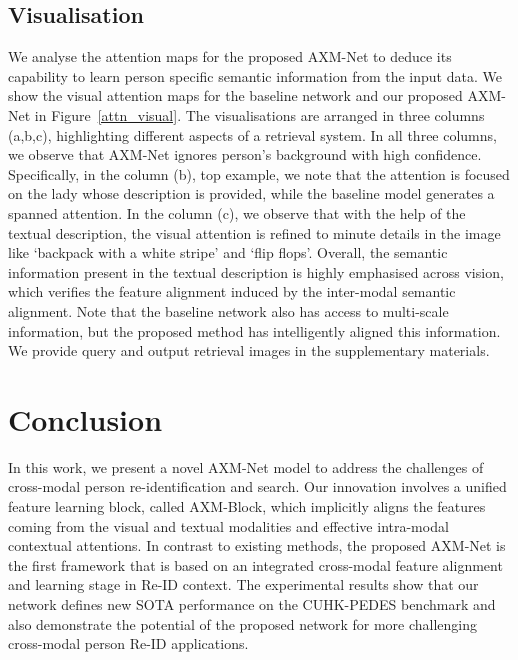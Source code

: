 \documentclass[10pt,twocolumn,letterpaper]{article}
\begin{document}
\subsection{Visualisation} \label{sec:Visualisation}
We analyse the attention maps for the proposed AXM-Net to deduce its capability to learn person specific semantic information from the input data. We show the visual attention maps for the baseline network and our proposed AXM-Net in Figure~\ref{attn_visual}. The visualisations are arranged in three columns (a,b,c), highlighting different aspects of a retrieval system. In all three columns, we observe that AXM-Net ignores person's background with high confidence. Specifically, in the column (b), top example, we note that the attention is focused on the lady whose description is provided, while the baseline model generates a spanned attention. In the column (c), we  observe that with the help of the textual description, the visual attention is refined to minute details in the image like `backpack with a white stripe' and `flip flops'. Overall, the semantic information present in the textual description is highly emphasised across vision, which verifies the feature alignment induced by the inter-modal semantic alignment. Note that the baseline network also has access to multi-scale information, but the proposed method has intelligently aligned this information. We provide query and output retrieval images in the supplementary materials.

\section{Conclusion}

In this work, we present a novel AXM-Net model to address the challenges of cross-modal person re-identification and search. Our innovation involves a unified feature learning block, called AXM-Block, which implicitly aligns the features coming from the visual and textual modalities and effective intra-modal contextual attentions. In contrast to existing methods, the proposed AXM-Net is the first framework that is based on an integrated cross-modal feature alignment and learning stage in Re-ID context. The experimental results show that our network defines new SOTA performance on the CUHK-PEDES benchmark and also demonstrate the potential of the proposed network for more challenging cross-modal person Re-ID applications.

{\small


}
\end{document}
